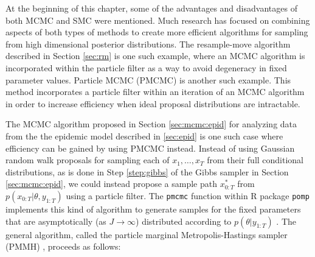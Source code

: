 At the beginning of this chapter, some of the advantages and disadvantages of both MCMC and SMC were mentioned. Much research has focused on combining aspects of both types of methods to create more efficient algorithms for sampling from high dimensional posterior distributions. The resample-move algorithm described in Section \ref{sec:rm} is one such example, where an MCMC algorithm is incorporated within the particle filter as a way to avoid degeneracy in fixed parameter values. Particle MCMC (PMCMC) \citep{Andr:Douc:Hol:pmcmc:2010} is another such example. This method incorporates a particle filter within an iteration of an MCMC algorithm in order to increase efficiency when ideal proposal distributions are intractable.

The MCMC algorithm proposed in Section \ref{sec:mcmc:epid} for analyzing data from the the epidemic model described in \ref{sec:epid} is one such case where efficiency can be gained by using PMCMC instead. Instead of using Gaussian random walk proposals for sampling each of $x_1,\ldots,x_T$ from their full conditional distributions, as is done in Step \ref{step:gibbs} of the Gibbs sampler in Section \ref{sec:mcmc:epid}, we could instead propose a sample path $x_{0:T}^*$ from $p(x_{0:T}|\theta,y_{1:T})$ using a particle filter. The {\tt pmcmc} function within R package {\tt pomp} \citep{pomp} implements this kind of algorithm to generate samples for the fixed parameters that are asymptotically (as $J \rightarrow \infty$) distributed according to $p(\theta|y_{1:T})$ \citep{Andr:Rob:2009:pseudomarg}. The general algorithm, called the particle marginal Metropolis-Hastings sampler (PMMH) \cite[Section 2.4.2][]{Andr:Douc:Hol:pmcmc:2010}, proceeds as follows:
